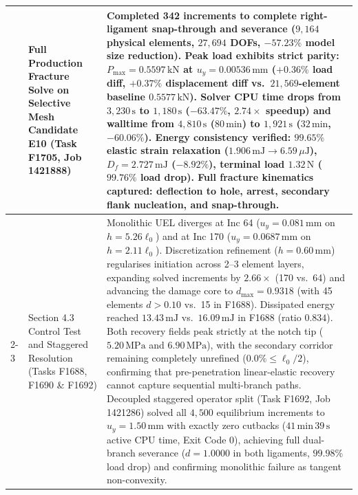 \begin{table}[htbp]
\begin{tabularx}{\textwidth}{p{2.2cm}p{3.8cm}X}
 & Full Production Fracture Solve on Selective Mesh Candidate E10 (Task F1705, Job 1421888) & Completed 342 increments to complete right-ligament snap-through and severance ($9{,}164$ physical elements, $27{,}694$ DOFs, $-57.23\%$ model size reduction). Peak load exhibits strict parity: $P_{\max} = 0.5597\,\mathrm{kN}$ at $u_y = 0.00536\,\mathrm{mm}$ ($+0.36\%$ load diff, $+0.37\%$ displacement diff vs.\ $21{,}569$-element baseline $0.5577\,\mathrm{kN}$). Solver CPU time drops from $3{,}230\,\mathrm{s}$ to $1{,}180\,\mathrm{s}$ ($-63.47\%$, $2.74\times$ speedup) and walltime from $4{,}810\,\mathrm{s}$ ($80\,\mathrm{min}$) to $1{,}921\,\mathrm{s}$ ($32\,\mathrm{min}$, $-60.06\%$). Energy consistency verified: $99.65\%$ elastic strain relaxation ($1.906\,\mathrm{mJ} \to 6.59\,\mu\mathrm{J}$), $D_f = 2.727\,\mathrm{mJ}$ ($-8.92\%$), terminal load $1.32\,\mathrm{N}$ ($99.76\%$ load drop). Full fracture kinematics captured: deflection to hole, arrest, secondary flank nucleation, and snap-through. \\
\cline{2-3}
 & Section 4.3 Control Test and Staggered Resolution (Tasks F1688, F1690 \& F1692) & Monolithic UEL diverges at Inc 64 ($u_y = 0.081\,\mathrm{mm}$ on $h = 5.26\ell_0$) and at Inc 170 ($u_y = 0.0687\,\mathrm{mm}$ on $h = 2.11\ell_0$). Discretization refinement ($h = 0.60\,\mathrm{mm}$) regularises initiation across 2--3 element layers, expanding solved increments by $2.66\times$ (170 vs.\ 64) and advancing the damage core to $d_{\max} = 0.9318$ (with 45 elements $d > 0.10$ vs.\ 15 in F1688). Dissipated energy reached $13.43\,\mathrm{mJ}$ vs.\ $16.09\,\mathrm{mJ}$ in F1688 (ratio $0.834$). Both recovery fields peak strictly at the notch tip ($5.20\,\mathrm{MPa}$ and $6.90\,\mathrm{MPa}$), with the secondary corridor remaining completely unrefined ($0.0\% \le \ell_0/2$), confirming that pre-penetration linear-elastic recovery cannot capture sequential multi-branch paths. Decoupled staggered operator split (Task F1692, Job 1421286) solved all $4{,}500$ equilibrium increments to $u_y = 1.50\,\mathrm{mm}$ with exactly zero cutbacks ($41\,\mathrm{min}\,39\,\mathrm{s}$ active CPU time, Exit Code 0), achieving full dual-branch severance ($d = 1.0000$ in both ligaments, $99.98\%$ load drop) and confirming monolithic failure as tangent non-convexity. \\
\hline
\end{tabularx}
\end{table}

